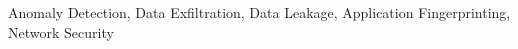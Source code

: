 \begin{abstract}

\end{abstract}

\begin{IEEEkeywords}
Anomaly Detection, Data Exfiltration, Data Leakage, Application Fingerprinting, Network Security
\end{IEEEkeywords}
